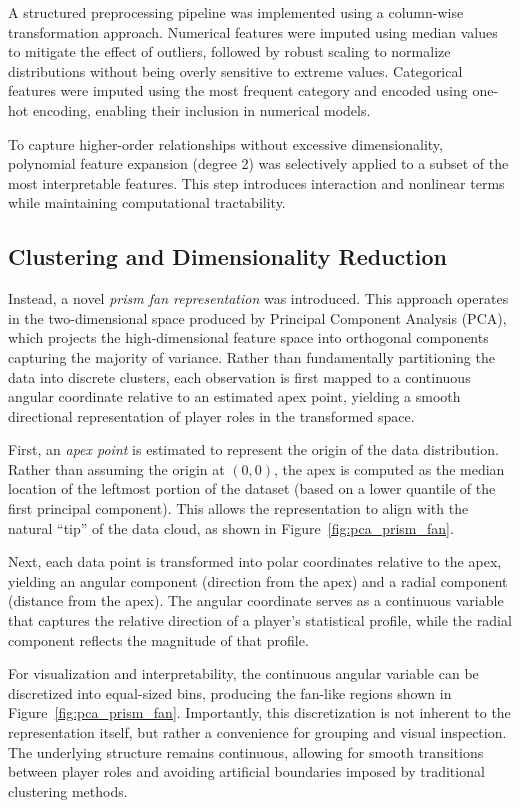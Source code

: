 \documentclass[conference]{IEEEtran}
\begin{document}
A structured preprocessing pipeline was implemented using a column-wise transformation approach. Numerical features were imputed using median values to mitigate the effect of outliers, followed by robust scaling to normalize distributions without being overly sensitive to extreme values. Categorical features were imputed using the most frequent category and encoded using one-hot encoding, enabling their inclusion in numerical models.

To capture higher-order relationships without excessive dimensionality, polynomial feature expansion (degree 2) was selectively applied to a subset of the most interpretable features. This step introduces interaction and nonlinear terms while maintaining computational tractability.
\subsection{Clustering and Dimensionality Reduction}

Instead, a novel \textit{prism fan representation} was introduced. This approach operates in the two-dimensional space produced by Principal Component Analysis (PCA), which projects the high-dimensional feature space into orthogonal components capturing the majority of variance. Rather than fundamentally partitioning the data into discrete clusters, each observation is first mapped to a continuous angular coordinate relative to an estimated apex point, yielding a smooth directional representation of player roles in the transformed space.

First, an \textit{apex point} is estimated to represent the origin of the data distribution. Rather than assuming the origin at $(0,0)$, the apex is computed as the median location of the leftmost portion of the dataset (based on a lower quantile of the first principal component). This allows the representation to align with the natural “tip” of the data cloud, as shown in Figure~\ref{fig:pca_prism_fan}.

Next, each data point is transformed into polar coordinates relative to the apex, yielding an angular component (direction from the apex) and a radial component (distance from the apex). The angular coordinate serves as a continuous variable that captures the relative direction of a player's statistical profile, while the radial component reflects the magnitude of that profile.

For visualization and interpretability, the continuous angular variable can be discretized into equal-sized bins, producing the fan-like regions shown in Figure~\ref{fig:pca_prism_fan}. Importantly, this discretization is not inherent to the representation itself, but rather a convenience for grouping and visual inspection. The underlying structure remains continuous, allowing for smooth transitions between player roles and avoiding artificial boundaries imposed by traditional clustering methods.
\end{document}
